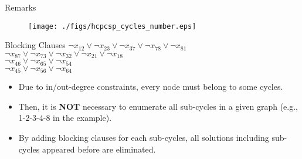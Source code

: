 \documentclass{beamer}
\begin{document}
\begin{frame}{Remarks}
\begin{minipage}[c]{0.4\textwidth}
  \begin{figure}
    \centering
    \texttt{[image: ./figs/hcpcsp\_cycles\_number.eps]}
  \end{figure}  
\end{minipage}  
\begin{minipage}[c]{0.55\textwidth}
\begin{block}{Blocking Clauses}
 $\neg x_{12} \vee \neg x_{23} \vee \neg x_{37} \vee \neg x_{78}\vee \neg x_{81}$\\
 $\neg x_{87} \vee \neg x_{73} \vee \neg x_{32}\vee \neg  x_{21} \vee \neg x_{18}$\\
 $\neg x_{46} \vee \neg x_{65} \vee \neg x_{54}$\\
 $\neg x_{45} \vee \neg x_{56} \vee \neg x_{64}$
\end{block}
\end{minipage}
\begin{itemize}
\item Due to in/out-degree constraints, every node must belong to
  some cycles.
\item Then, it is {\bf NOT} necessary to enumerate all sub-cycles in a given
  graph (e.g., 1-2-3-4-8 in the example).
\item By adding blocking clauses for each sub-cycles, all solutions
  including sub-cycles appeared before are eliminated. 
\end{itemize}
\end{frame}
\end{document}
